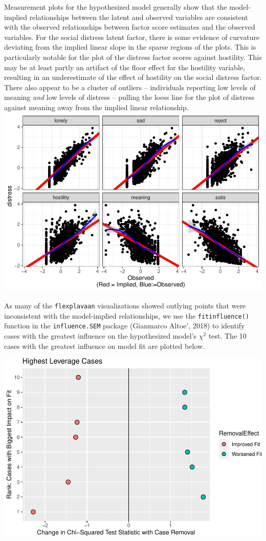 \documentclass[
  english,
  doc]{apa6}
\begin{document}
Measurement plots for the hypothesized model generally show that the model-implied relationships between the latent and observed variables are consistent with the observed relationships between factor score estimates and the observed variables. For the social distress latent factor, there is some evidence of curvature deviating from the implied linear slope in the sparse regions of the plots. This is particularly notable for the plot of the distress factor scores against hostility. This may be at least partly an artifact of the floor effect for the hostility variable, resulting in an underestimate of the effect of hostility on the social distress factor. There also appear to be a cluster of outliers -- individuals reporting low levels of meaning \emph{and} low levels of distress -- pulling the loess line for the plot of distress against meaning away from the implied linear relationship.\\
\includegraphics{flexplavaan_draft_files/figure-latex/unnamed-chunk-7-1.pdf}

As many of the \texttt{flexplavaan} visualizations showed outlying points that were inconsistent with the model-implied relationships, we use the \texttt{fitinfluence()} function in the \texttt{influence.SEM} package (Gianmarco Altoe', 2018) to identify cases with the greatest influence on the hypothesized model's \(\chi^2\) test. The 10 cases with the greatest influence on model fit are plotted below.

\includegraphics{flexplavaan_draft_files/figure-latex/unnamed-chunk-8-1.pdf}
\end{document}
